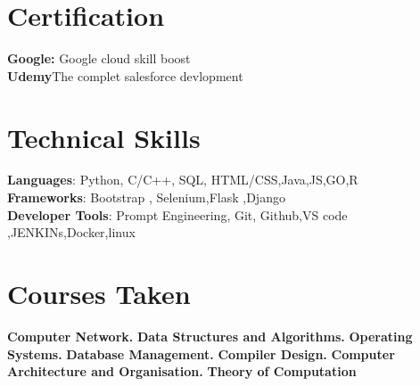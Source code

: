 \documentclass[12pt]{article}
\begin{document}
\section{Certification}
 \begin{itemize}[leftmargin=0.15in, label={}]
    \small{
     \textbf{Google: }{Google cloud skill boost  } }\hspace{} \\[0.5mm]
    \textbf{Udemy}{The complet salesforce devlopment} \\[0.5mm]
    
 \end{itemize}


\section{Technical Skills}
 \begin{itemize}[leftmargin=0.15in, label={}]
    \small{\item{
     \textbf{Languages}{: Python, C/C++, SQL, HTML/CSS,Java,JS,GO,R} \\[0.5mm]
     \textbf{Frameworks}{: Bootstrap , Selenium,Flask ,Django} \\[0.5mm]
     \textbf{Developer Tools}{: Prompt Engineering, Git, Github,VS code ,JENKINs,Docker,linux} \\[0.5mm]
    }}
 \end{itemize}

\section*{Courses Taken}
     \textbf{Computer Network.}
     \textbf{Data Structures and Algorithms.}
     \textbf{Operating Systems.}
     \textbf{Database Management.}
     \textbf{Compiler Design.}
     \textbf{Computer Architecture and Organisation.}
     \textbf{Theory of Computation}
     
     
     


\end{document}
